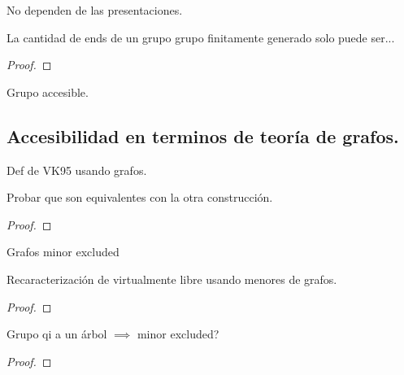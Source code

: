 \documentclass[tesis.tex]{subfiles}
\newcommand{\fg}{grupo finitamente generado }
\begin{document}
\begin{obs}
	No dependen de las presentaciones.
\end{obs}

\begin{teo}[Hopf]
	La cantidad de ends de un grupo \fg solo puede ser...
\end{teo}
\begin{proof}
\end{proof}

\begin{deff}
	Grupo accesible.
\end{deff}

\subsection{Accesibilidad en terminos de teoría de grafos.}

\begin{deff}
	Def de VK95 usando grafos.
\end{deff}

\begin{teo}
	Probar que son equivalentes con la otra construcción.
\end{teo}
\begin{proof}
	
\end{proof}


\begin{deff}
	Grafos minor excluded
\end{deff}

\begin{teo}[Khukro]
	Recaracterización de virtualmente libre usando menores de grafos.
\end{teo}
\begin{proof}
\end{proof}

\begin{teo}
	Grupo qi a un árbol $\implies$ minor excluded?
\end{teo}
\begin{proof}
\end{proof}
\end{document}
